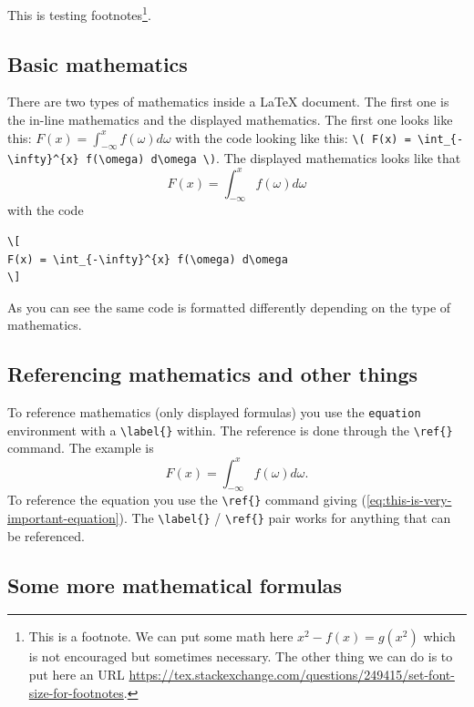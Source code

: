 \documentclass[english, twoside, 12pt, a4paper]{article}
\theoremstyle{definition}
\theoremstyle{plain}
\theoremstyle{remark}
\begin{document}
This is testing footnotes\footnote{This is a footnote. We can put some math here \( x^2 - f(x) = g(x^2) \) which is not encouraged but sometimes necessary. The other thing we can do is to put here an URL \url{https://tex.stackexchange.com/questions/249415/set-font-size-for-footnotes}. }.

\subsection{Basic mathematics}

There are two types of mathematics inside a \LaTeX{} document. The first one is the in-line mathematics and the displayed mathematics. The first one looks like this: \( F(x) = \int_{-\infty}^{x} f(\omega) d\omega \) with the code looking like this: \verb!\( F(x) = \int_{-\infty}^{x} f(\omega) d\omega \)!. The displayed mathematics looks like that
\[
F(x) = \int_{-\infty}^{x} f(\omega) d\omega
\]
with the code
\begin{verbatim}
\[
F(x) = \int_{-\infty}^{x} f(\omega) d\omega
\]
\end{verbatim}
As you can see the same code is formatted differently depending on the type of mathematics.

\subsection{Referencing mathematics and other things}

To reference mathematics (only displayed formulas) you use the \verb+equation+ environment with a \verb+\label{}+ within. The reference is done through the \verb+\ref{}+ command. The example is
\begin{equation}
\label{eq:this-is-very-important-equation}
F(x) = \int_{-\infty}^{x} f(\omega) d\omega.
\end{equation}
To reference the equation you use the \verb+\ref{}+ command giving (\ref{eq:this-is-very-important-equation}). The \verb+\label{}+ / \verb+\ref{}+ pair works for anything that can be referenced.

\subsection{Some more mathematical formulas}
\end{document}
